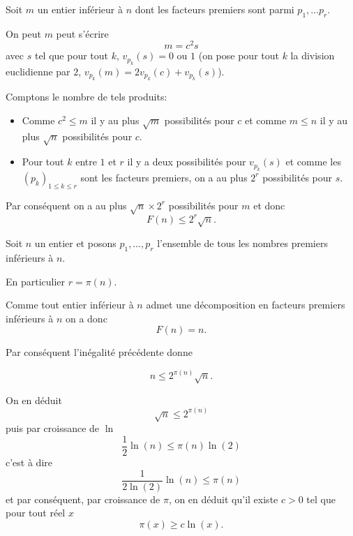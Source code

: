 \begin{sol}
    Soit $m$ un entier inférieur à $n$ dont les facteurs premiers sont parmi $p_1, \ldots p_r$.

    On peut $m$ peut s'écrire
    \[ m = c^2 s\]
    avec $s$ tel que pour tout $k$, $v_{p_k}(s) = 0 \text{ ou } 1$ (on pose pour tout $k$ la division euclidienne par $2$, $v_{p_k}(m) = 2 v_{p_k}(c) + v_{p_k}(s)$).

    Comptons le nombre de tels produits:
    \begin{itemize}
        \item Comme $c^2 \leq m$ il y au plus $\sqrt{m}$ possibilités pour $c$ et comme $m \leq n$ il y au plus $\sqrt{n}$ possibilités pour $c$.
        \item Pour tout $k$ entre $1$ et $r$ il y a deux possibilités pour $v_{p_k}(s)$ et comme les $(p_k)_{1 \leq k \leq r}$ sont les facteurs premiers, on a au plus $2^r$ possibilités pour $s$.
    \end{itemize}

    Par conséquent on a au plus $\sqrt{n} \times 2^r$ possibilités pour $m$ et donc
    \[\boxed{F(n) \leq 2^r \sqrt{n}}.\]

    Soit $n$ un entier et posons $p_1,\ldots,p_r$ l'ensemble de tous les nombres premiers inférieurs à $n$.
    
    En particulier $r = \pi(n)$.

    Comme tout entier inférieur à $n$ admet une décomposition en facteurs premiers inférieurs à $n$ on a donc
    \[F(n) = n.\]

    Par conséquent l'inégalité précédente donne

    \[n \leq 2^{\pi(n)}\sqrt{n}.\]

    On en déduit 
    \[\sqrt{n} \leq 2^{\pi(n)}\]
    puis par croissance de $\ln$ 
    \[\frac{1}{2} \ln(n) \leq \pi(n) \ln(2)\]
    c'est à dire
    \[\frac{1}{2 \ln(2)} \ln(n) \leq \pi(n)\]
    et par conséquent, par croissance de $\pi$, on en déduit qu'il existe $c>0$ tel que pour tout réel $x$
    \[\boxed{\pi(x) \geq c \ln(x)}.\]
\end{sol}


